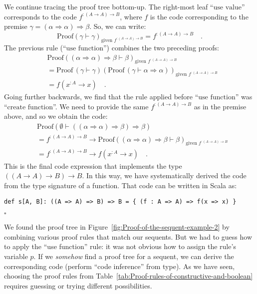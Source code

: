 We continue tracing the proof tree bottom-up. The right-most leaf
\textsf{``}$\text{use value}$\textsf{''} corresponds to the code $f^{:(A\rightarrow A)\rightarrow B}$,
where $f$ is the code corresponding to the premise $\gamma=(\alpha\Rightarrow\alpha)\Rightarrow\beta$.
So, we can write:
\[
\text{Proof}\left(\gamma\vdash\gamma\right)_{\text{given }f^{:(A\rightarrow A)\rightarrow B}}=f^{:(A\rightarrow A)\rightarrow B}\quad.
\]
The previous rule (\textsf{``}$\text{use function}$\textsf{''}) combines the two
preceding proofs:
\begin{align*}
 & \text{Proof}\left((\alpha\Rightarrow\alpha)\Rightarrow\beta\vdash\beta\right)_{\text{given }f^{:\left(A\rightarrow A\right)\rightarrow B}}\\
 & =\text{Proof}\,(\gamma\vdash\gamma)\left(\text{Proof}\,(\gamma\vdash\alpha\Rightarrow\alpha)\right)_{\text{given }f^{:\left(A\rightarrow A\right)\rightarrow B}}\\
 & =f(x^{:A}\rightarrow x)\quad.
\end{align*}
Going further backwards, we find that the rule applied before \textsf{``}$\text{use function}$\textsf{''}
was \textsf{``}$\text{create function}$\textsf{''}. We need to provide the same $f^{:\left(A\rightarrow A\right)\rightarrow B}$
as in the premise above, and so we obtain the code:
\begin{align*}
 & \text{Proof}\left(\emptyset\vdash((\alpha\Rightarrow\alpha)\Rightarrow\beta)\Rightarrow\beta\right)\\
 & =f^{:\left(A\rightarrow A\right)\rightarrow B}\rightarrow\text{Proof}\left((\alpha\Rightarrow\alpha)\Rightarrow\beta\vdash\beta\right)_{\text{given }f^{:\left(A\rightarrow A\right)\rightarrow B}}\\
 & =f^{:\left(A\rightarrow A\right)\rightarrow B}\rightarrow f(x^{:A}\rightarrow x)\quad.
\end{align*}
This is the final code expression that implements the type $((A\rightarrow A)\rightarrow B)\rightarrow B$.
In this way, we have systematically derived the code from the type
signature of a function. That code can be written in Scala as:
\begin{lstlisting}
def s[A, B]: ((A => A) => B) => B = { (f : A => A) => f(x => x) }
\end{lstlisting}
$\square$

We found the proof tree in Figure~\ref{fig:Proof-of-the-sequent-example-2}
by combining various proof rules that match our sequents. But we had
to guess how to apply the \textsf{``}use function\textsf{''} rule: it was not obvious
how to assign the rule\textsf{'}s variable $p$. If we \emph{somehow} find
a proof tree for a sequent, we can derive the corresponding code (perform
\textsf{``}code inference\textsf{''} from type). As we have seen, choosing the proof
rules from Table~\ref{tab:Proof-rules-of-constructive-and-boolean}
requires guessing or trying different possibilities. 

